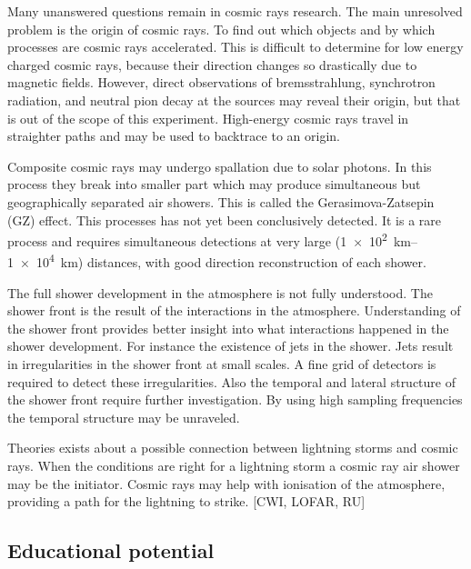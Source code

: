 Many unanswered questions remain in cosmic rays research. The main unresolved problem is the origin of cosmic rays. To find out which objects and by which processes are cosmic rays accelerated. This is difficult to determine for low energy charged cosmic rays, because their direction changes so drastically due to magnetic fields. However, direct observations of bremsstrahlung, synchrotron radiation, and neutral pion decay at the sources may reveal their origin, but that is out of the scope of this experiment. High-energy cosmic rays travel in straighter paths and may be used to backtrace to an origin.

Composite cosmic rays may undergo spallation due to solar photons. In this process they break into smaller part which may produce simultaneous but geographically separated air showers. This is called the Gerasimova-Zatsepin (GZ) effect. This processes has not yet been conclusively detected. It is a rare process and requires simultaneous detections at very large (\SIrange{1e2}{1e4}{\kilo\meter}) distances, with good direction reconstruction of each shower.

The full shower development in the atmosphere is not fully understood. The shower front is the result of the interactions in the atmosphere. Understanding of the shower front provides better insight into what interactions happened in the shower development. For instance the existence of jets in the shower. Jets result in irregularities in the shower front at small scales. A fine grid of detectors is required to detect these irregularities. Also the temporal and lateral structure of the shower front require further investigation. By using high sampling frequencies the temporal structure may be unraveled.

Theories exists about a possible connection between lightning storms and cosmic rays. When the conditions are right for a lightning storm a cosmic ray air shower may be the initiator. Cosmic rays may help with ionisation of the atmosphere, providing a path for the lightning to strike. [CWI, LOFAR, RU]

\subsection{Educational potential}


